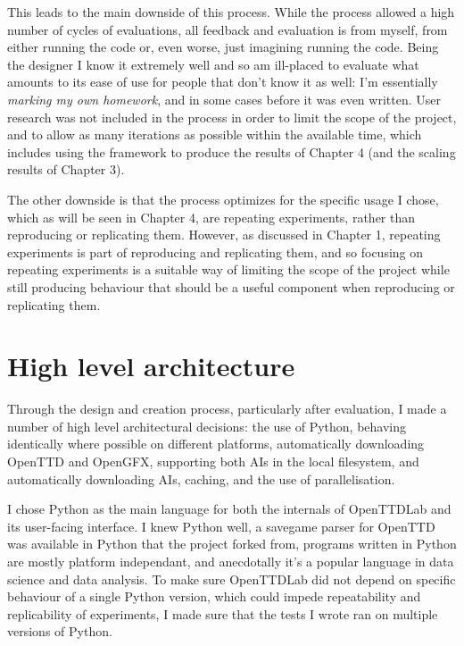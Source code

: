 \documentclass[logo,msc,dsti]{style/infthesis}    %
\begin{document}
{This leads to the main downside of this process. While the process allowed a high number of cycles of evaluations, all feedback and evaluation is from myself, from either running the code or, even worse, just imagining running the code. Being the designer I know it extremely well and so am ill-placed to evaluate what amounts to its ease of use for people that don't know it as well: I'm essentially \emph{marking my own homework}, and in some cases before it was even written. User research was not included in the process in order to limit the scope of the project, and to allow as many iterations as possible within the available time, which includes using the framework to produce the results of Chapter 4 (and the scaling results of Chapter 3).

The other downside is that the process optimizes for the specific usage I chose, which as will be seen in Chapter 4, are repeating experiments, rather than reproducing or replicating them. However, as discussed in Chapter 1, repeating experiments is part of reproducing and replicating them, and so focusing on repeating experiments is a suitable way of limiting the scope of the project while still producing behaviour that should be a useful component when reproducing or replicating them.


\section{High level architecture}

Through the design and creation process, particularly after evaluation, I made a number of high level architectural decisions: the use of Python, behaving identically where possible on different platforms, automatically downloading OpenTTD and OpenGFX, supporting both AIs in the local filesystem, and automatically downloading AIs, caching, and the use of parallelisation.

I chose Python as the main language for both the internals of OpenTTDLab and its user-facing interface. I knew Python well, a savegame parser for OpenTTD was available in Python \cite{Stout2024} that the project forked from, programs written in Python are mostly platform independant, and anecdotally it's a popular language in data science and data analysis. To make sure OpenTTDLab did not depend on specific behaviour of a single Python version, which could impede repeatability and replicability of experiments, I made sure that the tests I wrote ran on multiple versions of Python.

}
\end{document}

